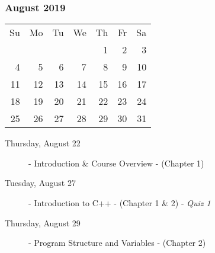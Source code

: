 \subsubsection*{August 2019}
\begin{tabular}{rrrrrrr}
Su & Mo & Tu & We & Th & Fr & Sa\\
   &    &    &    &  1 &  2 &  3\\
 4 &  5 &  6 &  7 &  8 &  9 & 10\\
11 & 12 & 13 & 14 & 15 & 16 & 17\\
18 & 19 & 20 & 21 & 22 & 23 & 24\\
25 & 26 & 27 & 28 & 29 & 30 & 31\\
\end{tabular}
\begin{description}
\item[Thursday, August 22]
  - Introduction \& Course Overview
  \newline- (Chapter 1)

\item[Tuesday, August 27]
  - Introduction to C++
  \newline- (Chapter 1 \& 2)
  \newline- {\em Quiz 1}
\item[Thursday, August 29]
  - Program Structure and Variables
  \newline- (Chapter 2) 
\end{description}


